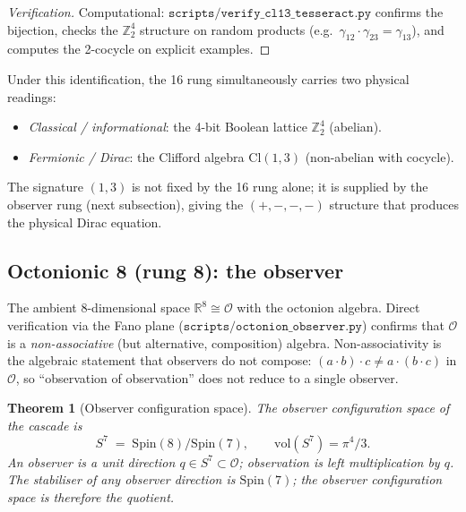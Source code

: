 \documentclass[12pt]{article}
\newtheorem{theorem}{Theorem}
\begin{document}
\begin{proof}[Verification]
Computational: $\texttt{scripts/verify\_cl13\_tesseract.py}$ confirms the bijection, checks the $\mathbb{Z}_2^4$ structure on random products (e.g.\ $\gamma_{12} \cdot \gamma_{23} = \gamma_{13}$), and computes the 2-cocycle on explicit examples.
\end{proof}

Under this identification, the 16 rung simultaneously carries two physical readings:
\begin{itemize}
    \item \emph{Classical / informational}: the 4-bit Boolean lattice $\mathbb{Z}_2^4$ (abelian).
    \item \emph{Fermionic / Dirac}: the Clifford algebra $\mathrm{Cl}(1,3)$ (non-abelian with cocycle).
\end{itemize}
The signature $(1, 3)$ is not fixed by the 16 rung alone; it is supplied by the observer rung (next subsection), giving the $(+, -, -, -)$ structure that produces the physical Dirac equation.

\subsection{Octonionic 8 (rung 8): the observer}\label{sec:lower:obs}

The ambient 8-dimensional space $\mathbb{R}^8 \cong \mathcal{O}$ with the octonion algebra. Direct verification via the Fano plane ($\texttt{scripts/octonion\_observer.py}$) confirms that $\mathcal{O}$ is a \emph{non-associative} (but alternative, composition) algebra. Non-associativity is the algebraic statement that observers do not compose: $(a \cdot b) \cdot c \neq a \cdot (b \cdot c)$ in $\mathcal{O}$, so ``observation of observation'' does not reduce to a single observer.

\begin{theorem}[Observer configuration space]\label{thm:observer}
The observer configuration space of the cascade is
\[
S^7 \;=\; \mathrm{Spin}(8) / \mathrm{Spin}(7), \qquad \mathrm{vol}(S^7) = \pi^4 / 3.
\]
An observer is a unit direction $q \in S^7 \subset \mathcal{O}$; observation is left multiplication by $q$. The stabiliser of any observer direction is $\mathrm{Spin}(7)$; the observer configuration space is therefore the quotient.
\end{theorem}
\end{document}
